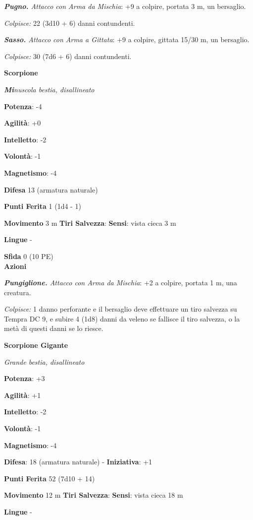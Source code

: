 \begin{multicols}{2}
\emph{\textbf{Pugno.} Attacco con Arma da Mischia}: +9 a colpire,
portata 3 m, un bersaglio.

\emph{Colpisce:} 22 (3d10 + 6) danni contundenti.

\emph{\textbf{Sasso.} Attacco con Arma a Gittata}: +9 a colpire, gittata
15/30 m, un bersaglio.

\emph{Colpisce:} 30 (7d6 + 6) danni contundenti.

\textbf{Scorpione}

\emph{\textbf{Mi}nuscola bestia, disallineato}

\textbf{Potenza}: -4

\textbf{Agilità}: +0

\textbf{Intelletto}: -2

\textbf{Volontà}: -1

\textbf{Magnetismo}: -4

\textbf{Difesa} 13 (armatura naturale)

\textbf{Punti Ferita} 1 (1d4 - 1)

\textbf{Movimento} 3 m
\textbf{Tiri Salvezza}:
\textbf{Sensi}: vista cieca 3 m

\textbf{Lingue} -

\textbf{Sfida} 0 (10 PE)\smallskip\\

\smallskip\textbf{Azioni}

\emph{\textbf{Pungiglione.} Attacco con Arma da Mischia}: +2 a colpire,
portata 1 m, una creatura.

\emph{Colpisce:} 1 danno perforante e il bersaglio deve effettuare un
tiro salvezza su Tempra DC 9, e subire 4 (1d8) danni da veleno se
fallisce il tiro salvezza, o la metà di questi danni se lo riesce.

\textbf{Scorpione Gigante}

\emph{Grande bestia, disallineato}

\textbf{Potenza}: +3

\textbf{Agilità}: +1

\textbf{Intelletto}: -2

\textbf{Volontà}: -1

\textbf{Magnetismo}: -4

\textbf{Difesa}: 18 (armatura naturale) - \textbf{Iniziativa}: +1

\textbf{Punti Ferita} 52 (7d10 + 14)

\textbf{Movimento} 12 m
\textbf{Tiri Salvezza}:
\textbf{Sensi}: vista cieca 18 m

\textbf{Lingue} -


\end{multicols}
